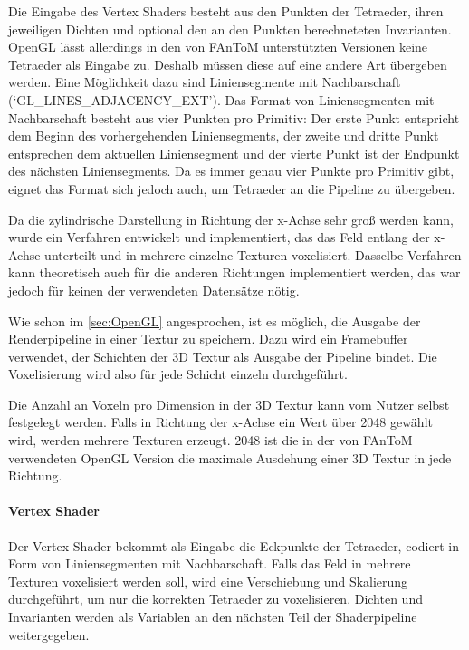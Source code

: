 \documentclass[a4paper,fontsize=12pt,toc=bib,halfparskip,ngerman]{scrartcl}
\begin{document}
Die Eingabe des Vertex Shaders besteht aus den Punkten der Tetraeder, ihren jeweiligen Dichten und optional den an den Punkten berechneteten Invarianten. OpenGL l\"asst allerdings in den von FAnToM unterst\"utzten Versionen keine Tetraeder als Eingabe zu. Deshalb m\"ussen diese auf eine andere Art \"ubergeben werden. Eine M\"oglichkeit dazu sind Liniensegmente mit Nachbarschaft (`GL\_LINES\_ADJACENCY\_EXT'). Das Format von Liniensegmenten mit Nachbarschaft besteht aus vier Punkten pro Primitiv: Der erste Punkt entspricht dem Beginn des vorhergehenden Liniensegments, der zweite und dritte Punkt entsprechen dem aktuellen Liniensegment und der vierte Punkt ist der Endpunkt des n\"achsten Liniensegments. Da es immer genau vier Punkte pro Primitiv gibt, eignet das Format sich jedoch auch, um Tetraeder an die Pipeline zu \"ubergeben.

Da die zylindrische Darstellung in Richtung der x-Achse sehr gro{\ss} werden kann, wurde ein Verfahren entwickelt und implementiert, das das Feld entlang der x-Achse unterteilt und in mehrere einzelne Texturen voxelisiert. Dasselbe Verfahren kann theoretisch auch f\"ur die anderen Richtungen implementiert werden, das war jedoch f\"ur keinen der verwendeten Datens\"atze n\"otig.

Wie schon im \cref{sec:OpenGL} angesprochen, ist es m\"oglich, die Ausgabe der Renderpipeline in einer Textur zu speichern. Dazu wird ein Framebuffer verwendet, der Schichten der 3D Textur als Ausgabe der Pipeline bindet. Die Voxelisierung wird also f\"ur jede Schicht einzeln durchgef\"uhrt.

Die Anzahl an Voxeln pro Dimension in der 3D Textur kann vom Nutzer selbst festgelegt werden. Falls in Richtung der x-Achse ein Wert \"uber 2048 gew\"ahlt wird, werden mehrere Texturen erzeugt. 2048 ist die in der von FAnToM verwendeten OpenGL Version die maximale Ausdehung einer 3D Textur in jede Richtung.

\paragraph{Vertex Shader}
Der Vertex Shader bekommt als Eingabe die Eckpunkte der Tetraeder, codiert in Form von Liniensegmenten mit Nachbarschaft. Falls das Feld in mehrere Texturen voxelisiert werden soll, wird eine Verschiebung und Skalierung durchgef\"uhrt, um nur die korrekten Tetraeder zu voxelisieren. Dichten und Invarianten werden als Variablen an den n\"achsten Teil der Shaderpipeline weitergegeben.
\end{document}
